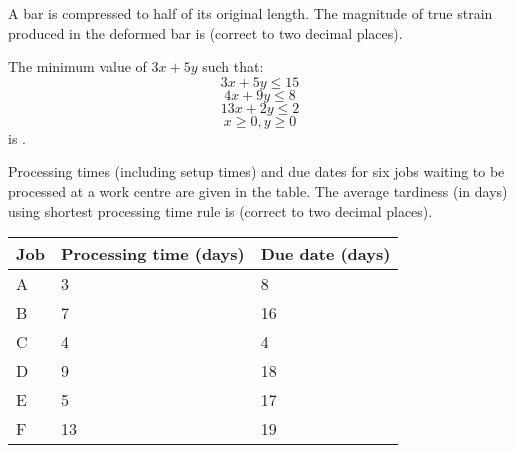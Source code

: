     \item A bar is compressed to half of its original length. The magnitude of true strain produced in the deformed bar is \underline{\hspace{1cm}} (correct to two decimal places).

    \item The minimum value of $3x+5y$ such that:
        $$3x+5y\leq15$$
        $$4x+9y\leq8$$
        $$13x+2y\leq2$$
        $$x\geq0,y\geq0$$
        is \underline{\hspace{1cm}}.

    \item Processing times (including setup times) and due dates for six jobs waiting to be processed at a work centre are given in the table. The average tardiness (in days) using shortest processing time rule is \underline{\hspace{1cm}} (correct to two decimal places).
        \begin{table}[!ht]
            \centering
            \begin{tabular}{|l|l|l|}
    \hline
    Job & Processing time (days) & Due date (days) \\
    \hline
    A   & 3                      & 8               \\
    \hline
    B   & 7                      & 16              \\
    \hline
    C   & 4                      & 4               \\
    \hline
    D   & 9                      & 18              \\
    \hline
    E   & 5                      & 17              \\
    \hline
    F   & 13                     & 19              \\
    \hline
\end{tabular}
        \end{table}

